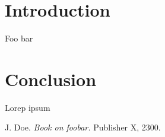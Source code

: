\documentclass{ctuthesis}
\begin{document}
\maketitle
\chapter{Introduction}
Foo bar


\chapter{Conclusion}

Lorep ipsum \cite{doe}



\begin{thebibliography}{1}
 J. Doe. \emph{Book on foobar.} Publisher X,
2300.
\end{thebibliography}
\end{document}
